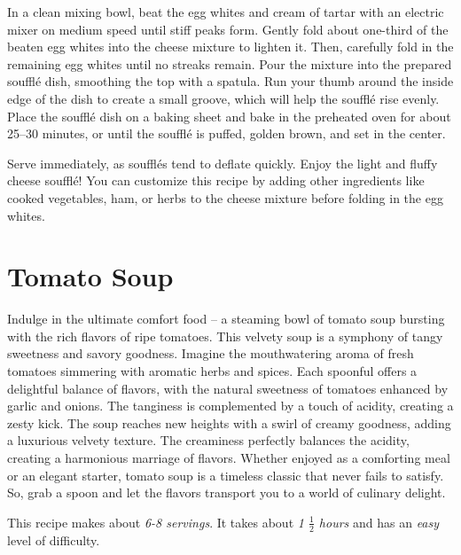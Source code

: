 In a clean mixing bowl, beat the egg whites and cream of tartar with an electric mixer on medium speed until stiff peaks form. Gently fold about one-third of the beaten egg whites into the cheese mixture to lighten it. Then, carefully fold in the remaining egg whites until no streaks remain. Pour the mixture into the prepared soufflé dish, smoothing the top with a spatula. Run your thumb around the inside edge of the dish to create a small groove, which will help the soufflé rise evenly. Place the soufflé dish on a baking sheet and bake in the preheated oven for about 25--30 minutes, or until the soufflé is puffed, golden brown, and set in the center.

Serve immediately, as soufflés tend to deflate quickly. Enjoy the light and fluffy cheese soufflé! You can customize this recipe by adding other ingredients like cooked vegetables, ham, or herbs to the cheese mixture before folding in the egg whites.

\section{Tomato Soup}
\label{tomatosoup}
Indulge in the ultimate comfort food -- a steaming bowl of tomato soup bursting with the rich flavors of ripe tomatoes. This velvety soup is a symphony of tangy sweetness and savory goodness. Imagine the mouthwatering aroma of fresh tomatoes simmering with aromatic herbs and spices. Each spoonful offers a delightful balance of flavors, with the natural sweetness of tomatoes enhanced by garlic and onions. The tanginess is complemented by a touch of acidity, creating a zesty kick. The soup reaches new heights with a swirl of creamy goodness, adding a luxurious velvety texture. The creaminess perfectly balances the acidity, creating a harmonious marriage of flavors. Whether enjoyed as a comforting meal or an elegant starter, tomato soup is a timeless classic that never fails to satisfy. So, grab a spoon and let the flavors transport you to a world of culinary delight.

This recipe makes about \emph{6-8 servings}. It takes about \emph{1 $\frac{1}{2}$ hours} and has an \emph{easy} level of difficulty. 

